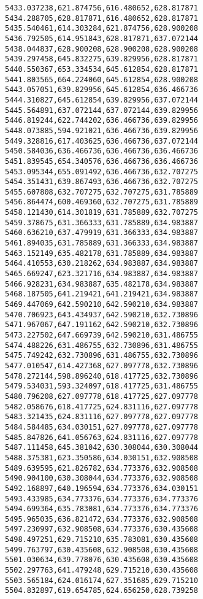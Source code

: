 \documentclass[11pt]{article}
\begin{document}
\begin{Verbatim}[commandchars=\\\{\}]
5433.037238,621.874756,616.480652,628.817871
5434.288705,628.817871,616.480652,628.817871
5435.540461,614.303284,621.874756,628.900208
5436.792505,614.951843,628.817871,637.072144
5438.044837,628.900208,628.900208,628.900208
5439.297458,645.832275,639.829956,628.817871
5440.550367,653.334534,645.612854,628.817871
5441.803565,664.224060,645.612854,628.900208
5443.057051,639.829956,645.612854,636.466736
5444.310827,645.612854,639.829956,637.072144
5445.564891,637.072144,637.072144,639.829956
5446.819244,622.744202,636.466736,639.829956
5448.073885,594.921021,636.466736,639.829956
5449.328816,617.403625,636.466736,637.072144
5450.584036,636.466736,636.466736,636.466736
5451.839545,654.340576,636.466736,636.466736
5453.095344,655.091492,636.466736,632.707275
5454.351431,639.867493,636.466736,632.707275
5455.607808,632.707275,632.707275,631.785889
5456.864474,600.469360,632.707275,631.785889
5458.121430,614.301819,631.785889,632.707275
5459.378675,631.366333,631.785889,634.983887
5460.636210,637.479919,631.366333,634.983887
5461.894035,631.785889,631.366333,634.983887
5463.152149,635.482178,631.785889,634.983887
5464.410553,630.218262,634.983887,634.983887
5465.669247,623.321716,634.983887,634.983887
5466.928231,634.983887,635.482178,634.983887
5468.187505,641.219421,641.219421,634.983887
5469.447069,642.590210,642.590210,634.983887
5470.706923,643.434937,642.590210,632.730896
5471.967067,647.191162,642.590210,632.730896
5473.227502,647.669739,642.590210,631.486755
5474.488226,631.486755,632.730896,631.486755
5475.749242,632.730896,631.486755,632.730896
5477.010547,614.427368,627.097778,632.730896
5478.272144,598.896240,618.417725,632.730896
5479.534031,593.324097,618.417725,631.486755
5480.796208,627.097778,618.417725,627.097778
5482.058676,618.417725,624.831116,627.097778
5483.321435,624.831116,627.097778,627.097778
5484.584485,634.030151,627.097778,627.097778
5485.847826,641.056763,624.831116,627.097778
5487.111458,645.381042,630.308044,630.308044
5488.375381,623.350586,634.030151,632.908508
5489.639595,621.826782,634.773376,632.908508
5490.904100,630.308044,634.773376,632.908508
5492.168897,640.196594,634.773376,634.030151
5493.433985,634.773376,634.773376,634.773376
5494.699364,635.783081,634.773376,634.773376
5495.965035,636.821472,634.773376,632.908508
5497.230997,632.908508,634.773376,630.435608
5498.497251,629.715210,635.783081,630.435608
5499.763797,630.435608,632.908508,630.435608
5501.030634,639.778076,630.435608,630.435608
5502.297763,641.479248,629.715210,630.435608
5503.565184,624.016174,627.351685,629.715210
5504.832897,619.654785,624.656250,628.739258

\end{Verbatim}
\end{document}
